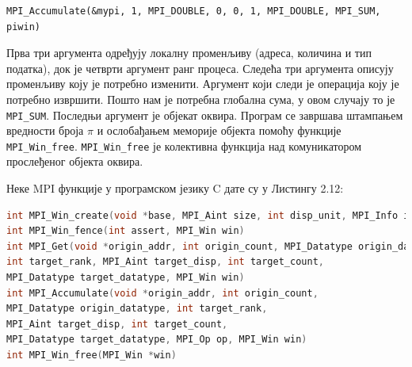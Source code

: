 \begin{verbatim}
MPI_Accumulate(&mypi, 1, MPI_DOUBLE, 0, 0, 1, MPI_DOUBLE, MPI_SUM, piwin)
\end{verbatim}

Прва три аргумента одређују локалну променљиву (адреса, количина и тип податка), док је четврти аргумент ранг процеса. Следећа три аргумента описују променљиву коју је потребно изменити.
Аргумент који следи је операција коју је потребно извршити. Пошто нам је потребна глобална сума, у овом случају то је \texttt{MPI\_SUM}. Последњи аргумент је објекат оквира.
Програм се завршава штампањем вредности броја $\pi$ и ослобађањем меморије објекта помоћу функције  \texttt{MPI\_Win\_free}.  \texttt{MPI\_Win\_free} је колективна функција над комуникатором прослеђеног објекта оквира.


Неке MPI функције у програмском језику C дате су у Листингу 2.12:

\begin{lstlisting}[style=nonumbers,frame=single,language=C, caption= MPI функције]
int MPI_Win_create(void *base, MPI_Aint size, int disp_unit, MPI_Info info,MPI_Comm comm, MPI_Win *win)
int MPI_Win_fence(int assert, MPI_Win win)
int MPI_Get(void *origin_addr, int origin_count, MPI_Datatype origin_datatype,
int target_rank, MPI_Aint target_disp, int target_count,
MPI_Datatype target_datatype, MPI_Win win)
int MPI_Accumulate(void *origin_addr, int origin_count,
MPI_Datatype origin_datatype, int target_rank,
MPI_Aint target_disp, int target_count,
MPI_Datatype target_datatype, MPI_Op op, MPI_Win win)
int MPI_Win_free(MPI_Win *win)
\end{lstlisting}


